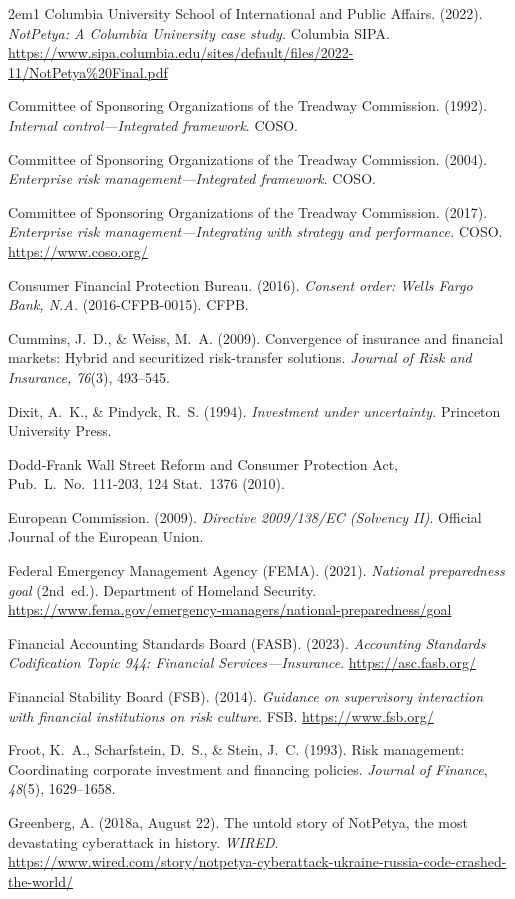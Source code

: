 \begin{hangparas}{2em}{1}
Columbia University School of International and Public Affairs. (2022).
\emph{NotPetya: A Columbia University case study.} Columbia SIPA.
\url{https://www.sipa.columbia.edu/sites/default/files/2022-11/NotPetya%20Final.pdf}

Committee of Sponsoring Organizations of the Treadway Commission. (1992).
\emph{Internal control---Integrated framework}. COSO.

Committee of Sponsoring Organizations of the Treadway Commission. (2004).
\emph{Enterprise risk management---Integrated framework}. COSO.

Committee of Sponsoring Organizations of the Treadway Commission. (2017).
\emph{Enterprise risk management---Integrating with strategy and performance.}
COSO. \url{https://www.coso.org/}

Consumer Financial Protection Bureau. (2016). \emph{Consent order: Wells
Fargo Bank, N.A.} (2016-CFPB-0015). CFPB.

Cummins, J.~D., \& Weiss, M.~A. (2009). Convergence of insurance and
financial markets: Hybrid and securitized risk-transfer solutions.
\emph{Journal of Risk and Insurance, 76}(3), 493--545.

Dixit, A.~K., \& Pindyck, R.~S. (1994). \emph{Investment under uncertainty.}
Princeton University Press.

Dodd-Frank Wall Street Reform and Consumer Protection Act, Pub.\ L.\ No.\
111-203, 124 Stat.\ 1376 (2010).

European Commission. (2009). \emph{Directive 2009/138/EC (Solvency II)}.
Official Journal of the European Union.

Federal Emergency Management Agency (FEMA). (2021). \emph{National
preparedness goal} (2nd~ed.). Department of Homeland Security.
\url{https://www.fema.gov/emergency-managers/national-preparedness/goal}

Financial Accounting Standards Board (FASB). (2023). \emph{Accounting
Standards Codification Topic 944: Financial Services---Insurance}.
\url{https://asc.fasb.org/}

Financial Stability Board (FSB). (2014). \emph{Guidance on supervisory
interaction with financial institutions on risk culture}. FSB.
\url{https://www.fsb.org/}

Froot, K.~A., Scharfstein, D.~S., \& Stein, J.~C. (1993). Risk management:
Coordinating corporate investment and financing policies. \emph{Journal of
Finance}, \emph{48}(5), 1629--1658.

Greenberg, A. (2018a, August 22). The untold story of NotPetya, the most
devastating cyberattack in history. \emph{WIRED}.
\url{https://www.wired.com/story/notpetya-cyberattack-ukraine-russia-code-crashed-the-world/}


\end{hangparas}
